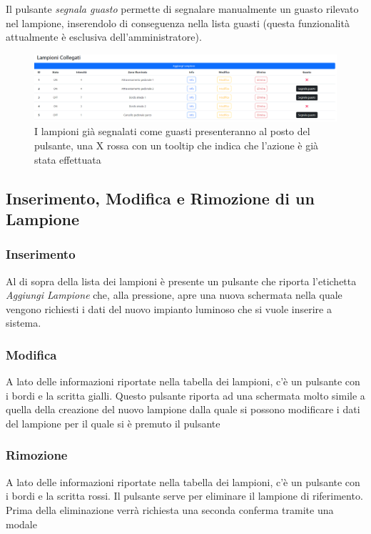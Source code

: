 \documentclass[a4paper, 12pt]{article}
\begin{document}
Il pulsante \textit{segnala guasto} permette di segnalare manualmente un guasto rilevato nel lampione, inserendolo di conseguenza nella lista guasti (questa funzionalità attualmente è esclusiva dell'amministratore).\\
\begin{figure}[H]
\centering
\includegraphics[width=\textwidth]{ListaLampioniConGuasti}
\caption{I lampioni già segnalati come guasti presenteranno al posto del pulsante, una X rossa con un tooltip che indica che l'azione è già stata effettuata}
\end{figure}

\subsection{Inserimento, Modifica e Rimozione di un Lampione}
\subsubsection{Inserimento}
Al di sopra della lista dei lampioni è presente un pulsante che riporta l'etichetta \textit{Aggiungi Lampione} che, alla pressione, apre una nuova schermata nella quale vengono richiesti i dati del nuovo impianto luminoso che si vuole inserire a sistema.

\subsubsection{Modifica}
A lato delle informazioni riportate nella tabella dei lampioni, c'è un pulsante con i bordi e la scritta gialli. Questo pulsante riporta ad una schermata molto simile a quella della creazione del nuovo lampione dalla quale si possono modificare i dati del lampione per il quale si è premuto il pulsante

\subsubsection{Rimozione}
A lato delle informazioni riportate nella tabella dei lampioni, c'è un pulsante con i bordi e la scritta rossi. Il pulsante serve per eliminare il lampione di riferimento. Prima della eliminazione verrà richiesta una seconda conferma tramite una modale
\end{document}
